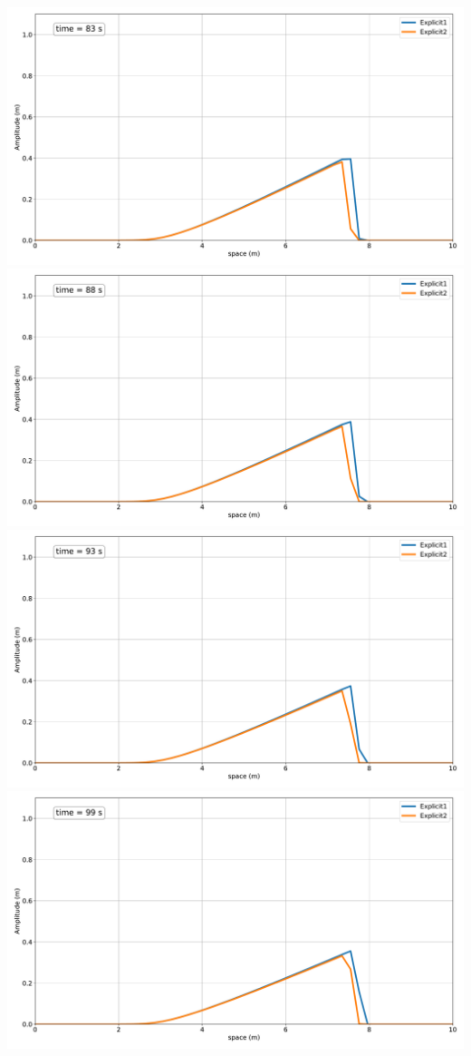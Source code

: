 \includegraphics[width=\linewidth]{../BurgersEquation/images/expl16.pdf}
\includegraphics[width=\linewidth]{../BurgersEquation/images/expl17.pdf}
\includegraphics[width=\linewidth]{../BurgersEquation/images/expl18.pdf}
\includegraphics[width=\linewidth]{../BurgersEquation/images/expl19.pdf}





